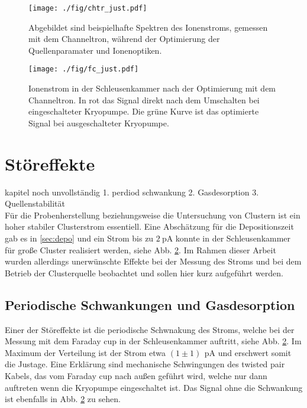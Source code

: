 \begin{figure}
  \centering
  \texttt{[image: ./fig/chtr\_just.pdf]}
  \caption{Abgebildet sind beispielhafte Spektren des Ionenstroms, gemessen mit dem Channeltron, während der Optimierung der Quellenparamater und Ionenoptiken.}
  \label{fig:chtr_just}
\end{figure}

\begin{figure}
  \centering
  \texttt{[image: ./fig/fc\_just.pdf]}
  \caption{Ionenstrom in der Schleusenkammer nach der Optimierung mit dem Channeltron. In rot das Signal direkt nach dem Umschalten bei eingeschalteter Kryopumpe. Die grüne Kurve ist das optimierte Signal bei ausgeschalteter Kryopumpe.}
  \label{fig:fc_just}
\end{figure}

\section{Störeffekte}
\label{sec:effekte}
kapitel noch unvollständig 1. perdiod schwankung 2. Gasdesorption 3. Quellenstabilität \\
Für die Probenherstellung beziehungsweise die Untersuchung von Clustern ist ein hoher stabiler Clusterstrom essentiell.
Eine Abschätzung für die Depositionszeit gab es in \ref{sec:depo} und ein Strom bis zu $\SI{2}{\pA}$ konnte in der Schleusenkammer für große Cluster realisiert werden, siehe Abb. \ref{fig:fc_just}.
Im Rahmen dieser Arbeit wurden allerdings unerwünschte Effekte bei der Messung des Stroms und bei dem Betrieb der Clusterquelle beobachtet und sollen hier kurz aufgeführt werden.

\subsection{Periodische Schwankungen und Gasdesorption}
Einer der Störeffekte ist die periodische Schwnakung des Stroms, welche bei der Messung mit dem Faraday cup in der Schleusenkammer auftritt, siehe Abb. \ref{fig:fc_just}.
Im Maximum der Verteilung ist der Strom etwa $(1\pm 1)\,\SI{}{\pA}$ und erschwert somit die Justage.
Eine Erklärung sind mechanische Schwingungen des twisted pair Kabels, das vom Faraday cup nach außen geführt wird, welche nur dann auftreten wenn die Kryopumpe eingeschaltet ist.
Das Signal ohne die Schwankung ist ebenfalls in Abb. \ref{fig:fc_just} zu sehen.\\

